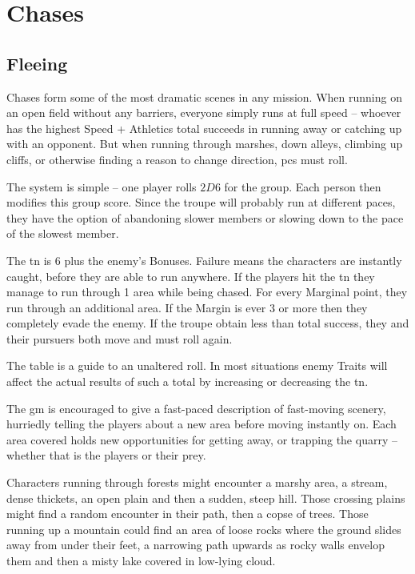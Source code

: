 \section{Chases}
\label{chases}

\chasechart

\begin{multicols}{2}

\subsection{Fleeing}

Chases form some of the most dramatic scenes in any mission.
When running on an open field without any barriers, everyone simply runs at full speed -- whoever has the highest Speed + Athletics total succeeds in running away or catching up with an opponent.
But when running through marshes, down alleys, climbing up cliffs, or otherwise finding a reason to change direction, \glspl{pc} must roll.

The system is simple -- one player rolls $2D6$ for the group.
Each person then modifies this group score.
Since the troupe will probably run at different paces, they have the option of abandoning slower members or slowing down to the pace of the slowest member.

The \gls{tn} is 6 plus the enemy's  Bonuses.
Failure means the characters are instantly caught, before they are able to run anywhere.
If the players hit the \gls{tn} they manage to run through 1 area while being chased.
For every Marginal point, they run through an additional area.
If the Margin is ever 3 or more then they completely evade the enemy.
If the troupe obtain less than total success, they and their pursuers both move and must roll again.

The table is a guide to an unaltered roll. In most situations enemy Traits will affect the actual results of such a total by increasing or decreasing the \gls{tn}.

The \gls{gm} is encouraged to give a fast-paced description of fast-moving scenery, hurriedly telling the players about a new area before moving instantly on.
Each area covered holds new opportunities for getting away, or trapping the quarry -- whether that is the players or their prey.

Characters running through forests might encounter a marshy area, a stream, dense thickets, an open plain and then a sudden, steep hill.
Those crossing plains might find a random encounter in their path, then a copse of trees.
Those running up a mountain could find an area of loose rocks where the ground slides away from under their feet, a narrowing path upwards as rocky walls envelop them and then a misty lake covered in low-lying cloud.


\end{multicols}
